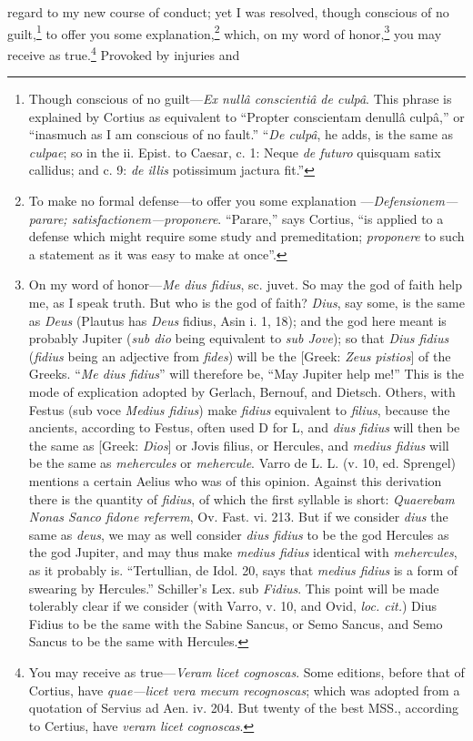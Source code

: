 regard to my new course of conduct; yet I was resolved, though conscious
of no guilt,\footnote{Though conscious of no guilt—\emph{Ex nullâ conscientiâ de culpâ}.
This phrase is explained by Cortius as equivalent to ``Propter
conscientam denullâ culpâ,'' or ``inasmuch as I am conscious of no
fault.'' ``\emph{De culpâ}, he adds, is the same as \emph{culpae}; so in the ii.
Epist. to Caesar, c. 1: Neque \emph{de futuro} quisquam satix callidus;
and c. 9: \emph{de illis} potissimum jactura fit.''} to offer you some explanation,\footnote{To make no formal defense—to offer you some explanation
—\emph{Defensionem—parare; satisfactionem—proponere}. ``Parare,'' says
Cortius, ``is applied to a defense which might require some study and
premeditation; \emph{proponere} to such a statement as it was easy to make
at once''.} which, on my word
of honor,\footnote{On my word of honor—\emph{Me dius fidius}, sc. juvet. So may the
god of faith help me, as I speak truth. But who is the god of faith?
\emph{Dius}, say some, is the same as \emph{Deus} (Plautus has \emph{Deus} fidius,
Asin i. 1, 18); and the god here meant is probably Jupiter (\emph{sub dio}
being equivalent to \emph{sub Jove}); so that \emph{Dius fidius} (\emph{fidius} being
an adjective from \emph{fides}) will be the [Greek: \emph{Zeus pistios}] of the
Greeks. ``\emph{Me dius fidius}'' will therefore be, ``May Jupiter help me!''
This is the mode of explication adopted by Gerlach, Bernouf, and
Dietsch. Others, with Festus (sub voce \emph{Medius fidius}) make \emph{fidius}
equivalent to \emph{filius}, because the ancients, according to Festus,
often used D for L, and \emph{dius fidius} will then be the same as [Greek:
\emph{Dios}] or Jovis filius, or Hercules, and \emph{medius fidius} will be the
same as \emph{mehercules} or \emph{mehercule}. Varro de L. L. (v. 10, ed.
Sprengel) mentions a certain Aelius who was of this opinion. Against
this derivation there is the quantity of \emph{fidius}, of which the first
syllable is short: \emph{Quaerebam Nonas Sanco fidone referrem}, Ov. Fast.
vi. 213. But if we consider \emph{dius} the same as \emph{deus}, we may as well
consider \emph{dius fidius} to be the god Hercules as the god Jupiter, and
may thus make \emph{medius fidius} identical with \emph{mehercules}, as it
probably is. ``Tertullian, de Idol. 20, says that \emph{medius fidius} is a
form of swearing by Hercules.'' Schiller's Lex. sub \emph{Fidius}. This
point will be made tolerably clear if we consider (with Varro, v. 10,
and Ovid, \emph{loc. cit.}) Dius Fidius to be the same with the Sabine
Sancus, or Semo Sancus, and Semo Sancus to be the same with Hercules.} you may receive as true.\footnote{You may receive as true—\emph{Veram licet cognoscas}. Some
editions, before that of Cortius, have \emph{quae—licet vera mecum
recognoscas}; which was adopted from a quotation of Servius ad Aen.
iv. 204. But twenty of the best MSS., according to Certius, have
\emph{veram licet cognoscas}.} Provoked by injuries and
